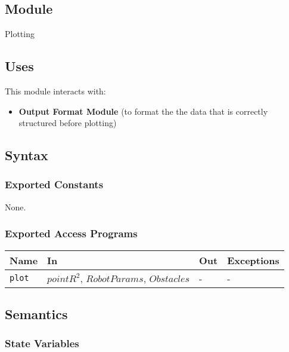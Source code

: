 \documentclass[12pt, titlepage]{article}
\begin{document}
\subsection{Module}

Plotting

\subsection{Uses}

This module interacts with:
\begin{itemize}

    \item \textbf{Output Format Module} (to format the the data that is correctly structured before plotting)
\end{itemize}

\subsection{Syntax}

\subsubsection{Exported Constants}

None.

\subsubsection{Exported Access Programs}

\begin{center}
\begin{tabular}{p{3.5cm} p{6cm} p{3cm} p{3cm}}
    \toprule
    \textbf{Name} & \textbf{In} & \textbf{Out} & \textbf{Exceptions} \\
    \midrule
    \texttt{plot} & $point R^{2}$, $RobotParams$, $Obstacles$  & - & - \\[4pt]

    \bottomrule
\end{tabular}
\end{center}

\subsection{Semantics}

\subsubsection{State Variables}
\end{document}
